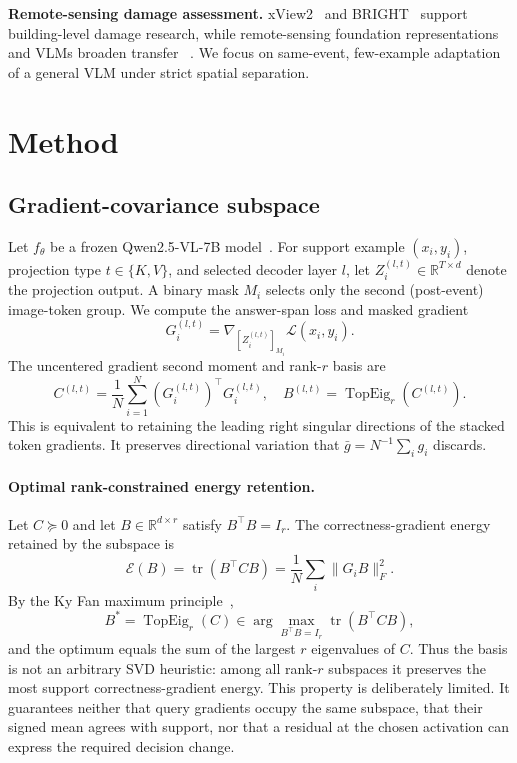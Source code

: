 \documentclass[conference]{IEEEtran}
\begin{document}
\textbf{Remote-sensing damage assessment.} xView2~\cite{gupta2021xview} and
\textsc{BRIGHT}~\cite{bright2024} support building-level damage research, while
remote-sensing foundation representations and VLMs broaden transfer
~\cite{ravi2023satmae,bhatia2024rerank}. We focus on same-event, few-example
adaptation of a general VLM under strict spatial separation.

\section{Method}
\subsection{Gradient-covariance subspace}
Let $f_\theta$ be a frozen Qwen2.5-VL-7B model~\cite{qwen2_5vl}. For support
example $(x_i,y_i)$, projection type $t\in\{K,V\}$, and selected decoder layer
$l$, let $Z_i^{(l,t)}\in\mathbb{R}^{T\times d}$ denote the projection output.
A binary mask $M_i$ selects only the second (post-event) image-token group. We
compute the answer-span loss and masked gradient
\begin{equation}
G_i^{(l,t)}=\nabla_{[Z_i^{(l,t)}]_{M_i}}\mathcal{L}(x_i,y_i).
\end{equation}
The uncentered gradient second moment and rank-$r$ basis are
\begin{equation}
C^{(l,t)}=\frac{1}{N}\sum_{i=1}^{N}(G_i^{(l,t)})^\top G_i^{(l,t)},\quad
B^{(l,t)}=\operatorname{TopEig}_r(C^{(l,t)}).
\end{equation}
This is equivalent to retaining the leading right singular directions of the
stacked token gradients. It preserves directional variation that
$\bar g=N^{-1}\sum_i g_i$ discards.

\paragraph{Optimal rank-constrained energy retention.}
Let $C\succeq0$ and let $B\in\mathbb{R}^{d\times r}$ satisfy
$B^\top B=I_r$.  The correctness-gradient energy retained by the subspace is
\begin{equation}
\mathcal E(B)=\operatorname{tr}(B^\top C B)
=\frac{1}{N}\sum_i\lVert G_iB\rVert_F^2.
\end{equation}
By the Ky Fan maximum principle~\cite{fan1951maximum},
\begin{equation}
B^*=\operatorname{TopEig}_r(C)
\in\arg\max_{B^\top B=I_r}\operatorname{tr}(B^\top C B),
\end{equation}
and the optimum equals the sum of the largest $r$ eigenvalues of $C$.
Thus the basis is not an arbitrary SVD heuristic: among all rank-$r$
subspaces it preserves the most support correctness-gradient energy.  This
property is deliberately limited.  It guarantees neither that query gradients
occupy the same subspace, that their signed mean agrees with support, nor that
a residual at the chosen activation can express the required decision change.
\end{document}
